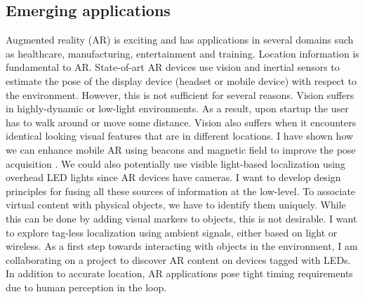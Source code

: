 \documentclass[10pt]{article}
\begin{document}
\subsection{Emerging applications}
Augmented reality (AR) is exciting and has applications in several domains such as healthcare, manufacturing, entertainment and training. Location information is fundamental to AR. State-of-art AR devices use vision and inertial sensors to estimate the pose of the display device (headset or mobile device) with respect to the environment. However, this is not sufficient for several reasons. Vision suffers in highly-dynamic or low-light environments. As a result, upon startup the user has to walk around or move some distance. Vision also suffers when it encounters identical looking visual features that are in different locations. I have shown how we can enhance mobile AR using beacons and magnetic field to improve the pose acquisition \cite{}. We could also potentially use visible light-based localization using overhead LED lights since AR devices have cameras. I want to develop design principles for fusing all these sources of information at the low-level. To associate virtual content with physical objects, we have to identify them uniquely. While this can be done by adding visual markers to objects, this is not desirable. I want to explore tag-less localization using ambient signals, either based on light or wireless. As a first step towards interacting with objects in the environment, I am collaborating on a project to discover AR content on devices tagged with LEDs. In addition to accurate location, AR applications pose tight timing requirements due to human perception in the loop. 
\end{document}
